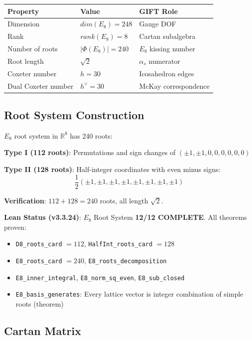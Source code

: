 \documentclass[11pt,a4paper]{article}
\newcommand{\E}{\mathrm{E}}
\newcommand{\dimE}{\mathrm{dim}}
\newcommand{\rk}{\mathrm{rank}}
\def\E{E}%
\def\dimE{dim}%
\def\rk{rank}%
\begin{document}
\begin{table}[H]
\centering
\begin{tabular}{lll}
\toprule
Property & Value & GIFT Role \\
\midrule
Dimension & $\dimE(\E_8) = 248$ & Gauge DOF \\
Rank & $\rk(\E_8) = 8$ & Cartan subalgebra \\
Number of roots & $|\Phi(\E_8)| = 240$ & $\E_8$ kissing number \\
Root length & $\sqrt{2}$ & $\alpha_s$ numerator \\
Coxeter number & $h = 30$ & Icosahedron edges \\
Dual Coxeter number & $h^\vee = 30$ & McKay correspondence \\
\bottomrule
\end{tabular}
\end{table}

\subsection{Root System Construction}

$\E_8$ root system in $\mathbb{R}^8$ has 240 roots:

\textbf{Type I (112 roots)}: Permutations and sign changes of $(\pm 1, \pm 1, 0, 0, 0, 0, 0, 0)$

\textbf{Type II (128 roots)}: Half-integer coordinates with even minus signs:
$$\frac{1}{2}(\pm 1, \pm 1, \pm 1, \pm 1, \pm 1, \pm 1, \pm 1, \pm 1)$$

\textbf{Verification}: $112 + 128 = 240$ roots, all length $\sqrt{2}$.

\textbf{Lean Status (v3.3.24)}: $\E_8$ Root System \textbf{12/12 COMPLETE}. All theorems proven:
\begin{itemize}
\item \texttt{D8\_roots\_card} $= 112$, \texttt{HalfInt\_roots\_card} $= 128$
\item \texttt{E8\_roots\_card} $= 240$, \texttt{E8\_roots\_decomposition}
\item \texttt{E8\_inner\_integral}, \texttt{E8\_norm\_sq\_even}, \texttt{E8\_sub\_closed}
\item \texttt{E8\_basis\_generates}: Every lattice vector is integer combination of simple roots (theorem)
\end{itemize}

\subsection{Cartan Matrix}
\end{document}
